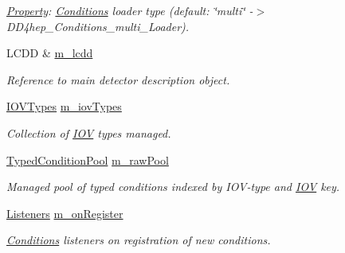 \begin{DoxyCompactItemize}
\begin{DoxyCompactList}\small\item\em \hyperlink{class_d_d4hep_1_1_property}{Property}: \hyperlink{namespace_d_d4hep_1_1_conditions}{Conditions} loader type (default: \char`\"{}multi\char`\"{} -\/$>$ DD4hep\_\-Conditions\_\-multi\_\-Loader). \item\end{DoxyCompactList}\item 
LCDD \& \hyperlink{class_d_d4hep_1_1_conditions_1_1_conditions_manager_object_a6ca16a780558379464d37ca9e691e9ef}{m\_\-lcdd}
\begin{DoxyCompactList}\small\item\em Reference to main detector description object. \item\end{DoxyCompactList}\item 
\hyperlink{class_d_d4hep_1_1_conditions_1_1_conditions_manager_object_a8c3b7d5bdfb7fc6bf6e61ddba5a5f652}{IOVTypes} \hyperlink{class_d_d4hep_1_1_conditions_1_1_conditions_manager_object_abc6f28abb03bdfa1f3c0d51de6e6ac9d}{m\_\-iovTypes}
\begin{DoxyCompactList}\small\item\em Collection of \hyperlink{class_d_d4hep_1_1_i_o_v}{IOV} types managed. \item\end{DoxyCompactList}\item 
\hyperlink{class_d_d4hep_1_1_conditions_1_1_conditions_manager_object_a1617c134372fbb79d06990707f19bb0c}{TypedConditionPool} \hyperlink{class_d_d4hep_1_1_conditions_1_1_conditions_manager_object_a90c9b5060b3a6299aa7d5d4e9a0d8105}{m\_\-rawPool}
\begin{DoxyCompactList}\small\item\em Managed pool of typed conditions indexed by IOV-\/type and \hyperlink{class_d_d4hep_1_1_i_o_v}{IOV} key. \item\end{DoxyCompactList}\item 
\hyperlink{class_d_d4hep_1_1_conditions_1_1_conditions_manager_object_aba0162524bc90a39e30bd5f1f0067ee2}{Listeners} \hyperlink{class_d_d4hep_1_1_conditions_1_1_conditions_manager_object_a28a1e3f34a87dcd305b0f71bb92f297f}{m\_\-onRegister}
\begin{DoxyCompactList}\small\item\em \hyperlink{namespace_d_d4hep_1_1_conditions}{Conditions} listeners on registration of new conditions. \item\end{DoxyCompactList}\item 

\end{DoxyCompactItemize}
